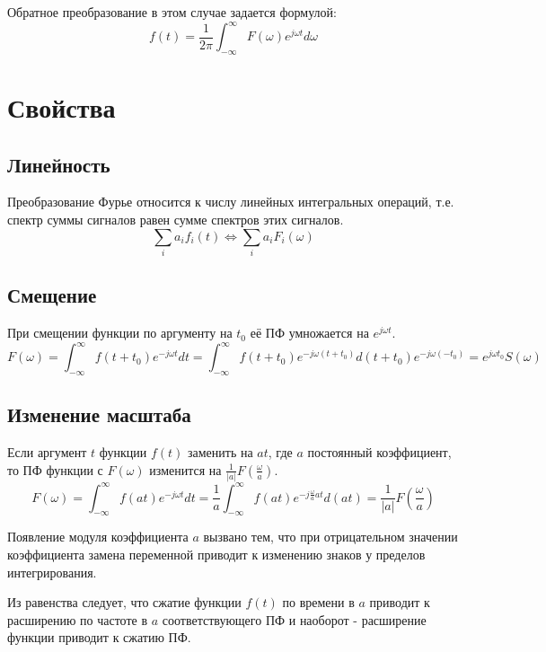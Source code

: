 \documentclass[a4paper,12pt]{report}
\begin{document}
    Обратное преобразование в этом случае задается формулой:
\begin{equation}
       f(t) = \frac{1}{2\pi} \int_{-\infty}^{\infty} F(\omega) e^{j \omega t} d \omega
\end{equation}

\section{Свойства}
\subsection{Линейность}
    Преобразование Фурье относится к числу линейных интегральных операций, т.е. спектр суммы сигналов равен сумме спектров этих сигналов.
\begin{equation}
       \sum \limits_{i} a_i f_i(t) \Leftrightarrow \sum \limits_{i} a_i F_i(\omega)
\end{equation}  

\subsection{Смещение}
    При смещении функции по аргументу на $t_0$ её ПФ умножается на $e^{j \omega t}$.
 \begin{equation}
       F(\omega) = \int_{-\infty}^{\infty} f(t+t_0) e^{-j \omega t} dt =  \int_{-\infty}^{\infty} f(t+t_0) e^{-j \omega (t+t_0)} d(t+t_0) e^{-j \omega (-t_0)} = e^{j \omega t_0} S(\omega)
\end{equation}    

\subsection{Изменение масштаба}
    Если аргумент $t$ функции $f(t)$ заменить на $at$, где $a$ постоянный коэффициент, то ПФ функции с $F(\omega)$ изменится на $\frac{1}{|a|}F(\frac{\omega}{a})$.
\begin{equation}
       F(\omega) = \int_{-\infty}^{\infty} f(at) e^{-j \omega t} dt = \frac{1}{a}\int_{-\infty}^{\infty} f(at) e^{-j \frac{\omega}{a} at} d(at)=\frac{1}{|a|}F(\frac{\omega}{a})
\end{equation}

    Появление модуля коэффициента $a$ вызвано тем, что при отрицательном значении коэффициента замена переменной приводит к изменению  знаков у пределов интегрирования.

    Из равенства следует, что сжатие функции $f(t)$ по времени в $a$ приводит к расширению по частоте в $a$ соответствующего ПФ и наоборот -  расширение функции приводит к сжатию ПФ.  
    
\end{document}

